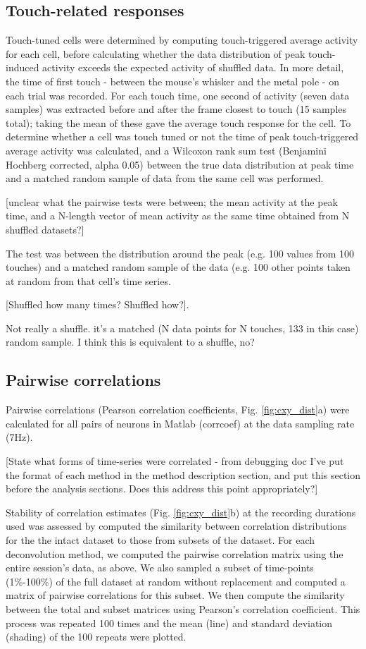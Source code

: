 \documentclass[a4paper,11pt]{article}
\begin{document}
\subsection{Touch-related responses}
Touch-tuned cells were determined by computing touch-triggered average activity for each cell, before calculating whether the data distribution of peak touch-induced activity exceeds the expected activity of shuffled data. In more detail, the time of first touch - between the mouse's whisker and the metal pole - on each trial was recorded. For each touch time, one second of activity (seven data samples) was extracted before and after the frame closest to touch (15 samples total); taking the mean of these gave the average touch response for the cell. To determine whether a cell was touch tuned or not the time of peak touch-triggered average activity was calculated, and a Wilcoxon rank sum test (Benjamini Hochberg corrected, alpha 0.05) between the true data distribution at peak time and a matched random sample of data from the same cell was performed.

[unclear what the pairwise tests were between; the mean activity at the peak time, and a N-length vector of mean activity as the same time obtained from N shuffled datasets?] 
 
 {\color{red} The test was between the distribution around the peak (e.g. 100 values from 100 touches) and a matched random sample of the data (e.g. 100 other points taken at random from that cell's time series.}
 
[Shuffled how many times? Shuffled how?]. 

{\color{red} Not really a shuffle. it's a matched (N data points for N touches, 133 in this case) random sample. I think this is equivalent to a shuffle, no?}

\subsection{Pairwise correlations}
Pairwise correlations (Pearson correlation coefficients, Fig. \ref{fig:cxy_dist}a) were calculated for all pairs of neurons in Matlab (corrcoef) at the data sampling rate (7Hz). 

[State what forms of time-series were correlated - from debugging doc {\color{red} I've put the format of each method in the method description section, and put this section before the analysis sections. Does this address this point appropriately?}]  

Stability of correlation estimates (Fig. \ref{fig:cxy_dist}b) at the recording durations used was assessed by computed the similarity between correlation distributions for the the intact dataset to those from subsets of the dataset. For each deconvolution method, we computed the pairwise correlation matrix using the entire session’s data, as above. We also sampled a subset of time-points (1\%-100\%) of the full dataset at random without replacement and computed a matrix of pairwise correlations for this subset. We then compute the similarity between the total and subset matrices using Pearson’s correlation coefficient. This process was repeated 100 times and the mean (line) and standard deviation (shading) of the 100 repeats were plotted.
\end{document}
